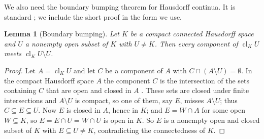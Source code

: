\documentclass[11pt]{amsart}
\newtheorem{lemma}[theorem]{Lemma}
\theoremstyle{definition}
\theoremstyle{remark}
\newcommand{\cl}{\operatorname{cl}}
\numberwithin{equation}{section}
\begin{document}
We also need the boundary bumping theorem for Hausdorff continua. It is standard \cite[Section~6.1]{engelking}; we include the short proof in the form we use.

\begin{lemma}[Boundary bumping]\label{lem:bump}
Let $K$ be a compact connected Hausdorff space and $U$ a nonempty open subset of $K$ with $U\ne K$. Then every component of $\cl_KU$ meets $\cl_KU\setminus U$.
\end{lemma}
\begin{proof}
Let $A=\cl_KU$ and let $C$ be a component of $A$ with $C\cap(A\setminus U)=\emptyset$. In the compact Hausdorff space $A$ the component $C$ is the intersection of the sets containing $C$ that are open and closed in $A$ \cite[Section~6.1]{engelking}. These sets are closed under finite intersections and $A\setminus U$ is compact, so one of them, say $E$, misses $A\setminus U$; thus $C\subseteq E\subseteq U$. Now $E$ is closed in $A$, hence in $K$; and $E=W\cap A$ for some open $W\subseteq K$, so $E=E\cap U=W\cap U$ is open in $K$. So $E$ is a nonempty open and closed subset of $K$ with $E\subseteq U\ne K$, contradicting the connectedness of $K$.
\end{proof}
\end{document}
